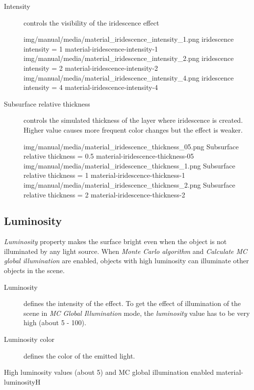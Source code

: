 \begin{description}
	\item[Intensity] controls the visibility of the iridescence effect
	
	\threeImagesWithTwoCaptionsFullWidth
	{img/manual/media/material_iridescence_intensity_1.png}
	{iridescence intensity = 1}
	{material-iridescence-intensity-1}
	{img/manual/media/material_iridescence_intensity_2.png}
	{iridescence intensity = 2}
	{material-iridescence-intensity-2}
	{img/manual/media/material_iridescence_intensity_4.png}
	{iridescence intensity = 4}
	{material-iridescence-intensity-4}
	
	\item[Subsurface relative thickness] controls the simulated thickness of the layer where iridescence is created. Higher value causes more frequent color changes but the effect is weaker.
	
	\threeImagesWithTwoCaptionsFullWidth
	{img/manual/media/material_iridescence_thickness_05.png}
	{Subsurface relative thickness = 0.5}
	{material-iridescence-thickness-05}
	{img/manual/media/material_iridescence_thickness_1.png}
	{Subsurface relative thickness = 1}
	{material-iridescence-thickness-1}
	{img/manual/media/material_iridescence_thickness_2.png}
	{Subsurface relative thickness = 2}
	{material-iridescence-thickness-2}
	
\end{description}

\subsection{Luminosity}\label{materials-luminosity}

\emph{Luminosity} property makes the surface bright even when the object is not illuminated by any light source. When \emph{Monte Carlo algorithm} and \emph{Calculate MC global illumination} are enabled, objects with high luminosity can illuminate other objects in the scene. 

\begin{description}
	\item[Luminosity] defines the intensity of the effect. To get the effect of illumination of the scene in\emph{ MC Global Illumination} mode, the \emph{luminosity} value has to be very high (about 5 - 100). 
	\item[Luminosity color] defines the color of the emitted light.
\end{description}

{High luminosity values (about 5) and MC global illumination enabled}
{material-luminosity}{H}

